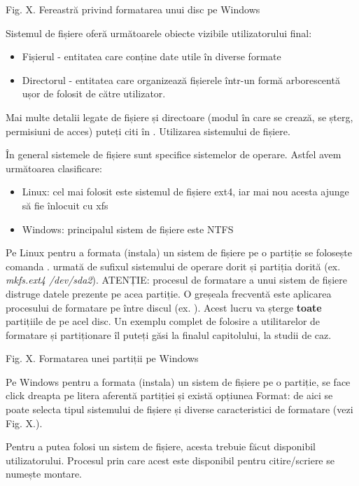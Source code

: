 Fig. X. Fereastră privind formatarea unui disc pe Windows

Sistemul de fișiere oferă următoarele obiecte vizibile utilizatorului final:

\begin{itemize}
	\item Fișierul - entitatea care conține date utile în diverse formate
	\item Directorul - entitatea care organizează fișierele într-un formă
		arborescentă ușor de folosit de către utilizator.
\end{itemize}

Mai multe detalii legate de fișiere și directoare (modul în care se crează, se
șterg, permisiuni de acces) puteți citi în
. Utilizarea sistemului de
fișiere.

În general sistemele de fișiere sunt specifice sistemelor de operare. Astfel avem următoarea clasificare:

\begin{itemize}
	\item Linux: cel mai folosit este sistemul de fișiere ext4, iar mai nou
		acesta ajunge să fie înlocuit cu xfs
	\item Windows: principalul sistem de fișiere este NTFS
\end{itemize}

Pe Linux pentru a formata (instala) un sistem de fișiere pe o partiție se
folosește comanda . urmată de sufixul sistemului de operare dorit și
partiția dorită (ex. \textit{mkfs.ext4 /dev/sda2}). ATENȚIE: procesul de
formatare a unui sistem de fișiere distruge datele prezente pe acea partiție. O
greșeala frecventă este aplicarea procesului de formatare pe între discul (ex.
). Acest lucru va șterge \textbf{toate} partițiile de pe
acel disc. Un exemplu complet de folosire a utilitarelor de formatare și
partiționare îl puteți găsi la finalul capitolului, la studii de caz.

Fig. X. Formatarea unei partiții pe Windows

Pe Windows pentru a formata (instala) un sistem de fișiere pe o partiție, se
face click dreapta pe litera aferentă partiției și există opțiunea Format: de
aici se poate selecta tipul sistemului de fișiere și diverse caracteristici de
formatare (vezi Fig. X.).

Pentru a putea folosi un sistem de fișiere, acesta trebuie făcut disponibil
utilizatorului. Procesul prin care acest este disponibil pentru citire/scriere
se numește montare.

